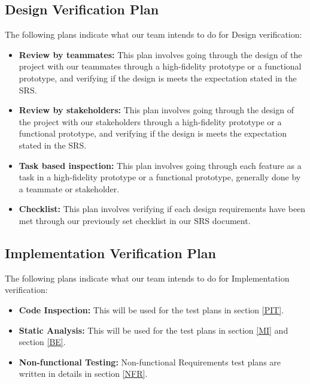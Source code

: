 \documentclass[12pt, titlepage]{article}
\begin{document}
\subsection{Design Verification Plan}

The following plans indicate what our team intends to do for Design verification:
\begin{itemize}
    \item \textbf{Review by teammates:} This plan involves going through the design of the project with our teammates through a high-fidelity prototype or a functional prototype, and verifying if the design is meets the expectation stated in the SRS.
    \item \textbf{Review by stakeholders:} This plan involves going through the design of the project with our stakeholders through a high-fidelity prototype or a functional prototype, and verifying if the design is meets the expectation stated in the SRS.
    \item \textbf{Task based inspection:} This plan involves going through each feature as a task in a high-fidelity prototype or a functional prototype, generally done by a teammate or stakeholder.
    \item \textbf{Checklist:} This plan involves verifying if each design requirements have been met through our previously set checklist in our SRS document.
\end{itemize}

\subsection{Implementation Verification Plan}
The following plans indicate what our team intends to do for Implementation verification:
\begin{itemize}
    \item \textbf{Code Inspection:} This will be used for the test plans in section \ref{PIT}.
    \item \textbf{Static Analysis:} This will be used for the test plans in section \ref{MI} and section \ref{BE}.
    \item \textbf{Non-functional Testing:} Non-functional Requirements test plans are written in details in section \ref{NFR}.
\end{itemize}
\end{document}
